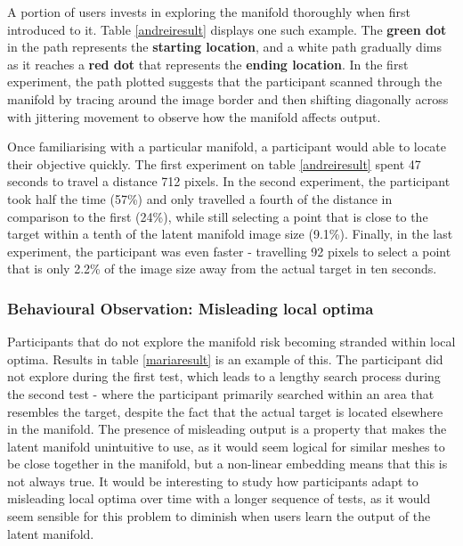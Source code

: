 \documentclass[ %
author={Dillon Keith Diep},
supervisor={Dr. Carl Henrik Ek},
degree={MEng},
title={ART-CG Hair:},
subtitle={Assisted Real-time Content Generation of Stylised Virtual Hair},
type={Research},
year={2017} ]{dissertation}
\begin{document}
A portion of users invests in exploring the manifold thoroughly when first introduced to it. Table \ref{andreiresult} displays one such example. The \textbf{green dot} in the path represents the \textbf{starting location}, and a white path gradually dims as it reaches a \textbf{red dot} that represents the \textbf{ending location}. In the first experiment, the path plotted suggests that the participant scanned through the manifold by tracing around the image border and then shifting diagonally across with jittering movement to observe how the manifold affects output.

Once familiarising with a particular manifold, a participant would able to locate their objective quickly. The first experiment on table \ref{andreiresult} spent 47 seconds to travel a distance 712 pixels. In the second experiment, the participant took half the time (57\%) and only travelled a fourth of the distance in comparison to the first (24\%), while still selecting a point that is close to the target within a tenth of the latent manifold image size (9.1\%). Finally, in the last experiment, the participant was even faster - travelling 92 pixels to select a point that is only 2.2\% of the image size away from the actual target in ten seconds.

\subsubsection{Behavioural Observation: Misleading local optima}

Participants that do not explore the manifold risk becoming stranded within local optima. Results in table \ref{mariaresult} is an example of this. The participant did not explore during the first test, which leads to a lengthy search process during the second test - where the participant primarily searched within an area that resembles the target, despite the fact that the actual target is located elsewhere in the manifold. The presence of misleading output is a property that makes the latent manifold unintuitive to use, as it would seem logical for similar meshes to be close together in the manifold, but a non-linear embedding means that this is not always true. It would be interesting to study how participants adapt to misleading local optima over time with a longer sequence of tests, as it would seem sensible for this problem to diminish when users learn the output of the latent manifold.
\end{document}
